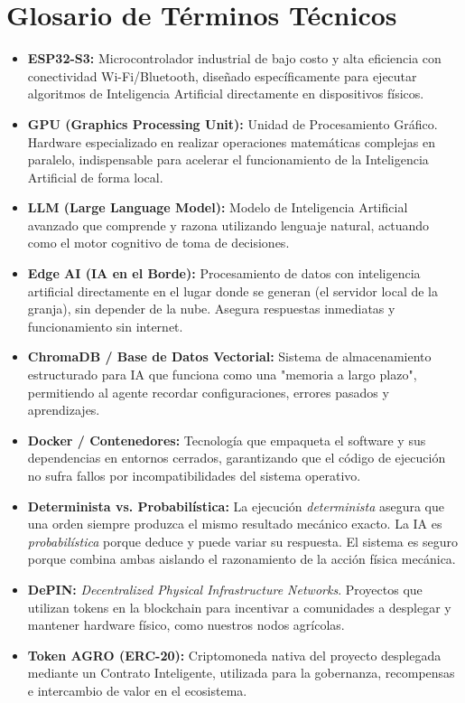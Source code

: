 \documentclass[12pt,a4paper]{article}
\begin{document}
\section{Glosario de Términos Técnicos}
\begin{itemize}[label=$\bullet$]
    \item \textbf{ESP32-S3:} Microcontrolador industrial de bajo costo y alta eficiencia con conectividad Wi-Fi/Bluetooth, diseñado específicamente para ejecutar algoritmos de Inteligencia Artificial directamente en dispositivos físicos.
    \item \textbf{GPU (Graphics Processing Unit):} Unidad de Procesamiento Gráfico. Hardware especializado en realizar operaciones matemáticas complejas en paralelo, indispensable para acelerar el funcionamiento de la Inteligencia Artificial de forma local.
    \item \textbf{LLM (Large Language Model):} Modelo de Inteligencia Artificial avanzado que comprende y razona utilizando lenguaje natural, actuando como el motor cognitivo de toma de decisiones.
    \item \textbf{Edge AI (IA en el Borde):} Procesamiento de datos con inteligencia artificial directamente en el lugar donde se generan (el servidor local de la granja), sin depender de la nube. Asegura respuestas inmediatas y funcionamiento sin internet.
    \item \textbf{ChromaDB / Base de Datos Vectorial:} Sistema de almacenamiento estructurado para IA que funciona como una "memoria a largo plazo", permitiendo al agente recordar configuraciones, errores pasados y aprendizajes.
    \item \textbf{Docker / Contenedores:} Tecnología que empaqueta el software y sus dependencias en entornos cerrados, garantizando que el código de ejecución no sufra fallos por incompatibilidades del sistema operativo.
    \item \textbf{Determinista vs. Probabilística:} La ejecución \textit{determinista} asegura que una orden siempre produzca el mismo resultado mecánico exacto. La IA es \textit{probabilística} porque deduce y puede variar su respuesta. El sistema es seguro porque combina ambas aislando el razonamiento de la acción física mecánica.
    \item \textbf{DePIN:} \textit{Decentralized Physical Infrastructure Networks}. Proyectos que utilizan tokens en la blockchain para incentivar a comunidades a desplegar y mantener hardware físico, como nuestros nodos agrícolas.
    \item \textbf{Token AGRO (ERC-20):} Criptomoneda nativa del proyecto desplegada mediante un Contrato Inteligente, utilizada para la gobernanza, recompensas e intercambio de valor en el ecosistema.
\end{itemize}
\end{document}
